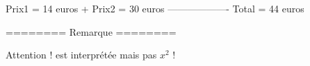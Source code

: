 \begin{pseudoverb*}
  Prix1 = 14 euros 
+ Prix2 = 30 euros
-------------------
  Total = 44 euros


========
Remarque
========

Attention ! \squaremacro{} est
interprétée mais pas $x^2$ !
\end{pseudoverb*} 
